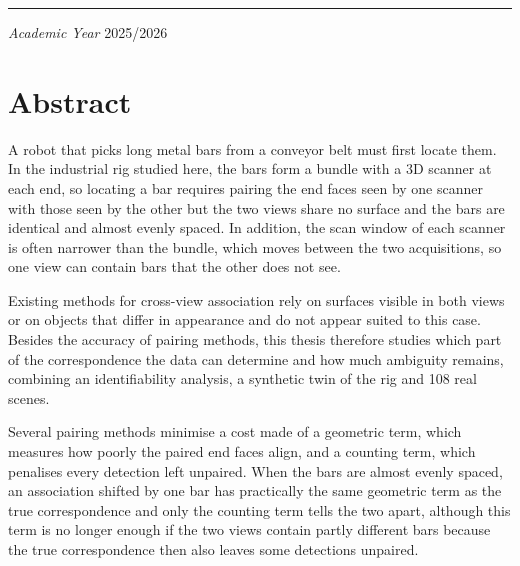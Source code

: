 \documentclass[a4paper, 12pt, twoside]{book}
\begin{document}
\begin{titlepage}
\vspace{1.5cm}

\hrule

\vspace{0.25cm}

\begin{center}
\large
\textit{Academic Year }2025/2026
\end{center}

\end{titlepage}

\restoregeometry
\normalsize

\clearpage
\null
\thispagestyle{empty}
\clearpage


\frontmatter
\chapter{Abstract}

A robot that picks long metal bars from a conveyor belt must first locate them. In the industrial rig studied here, the bars form a bundle with a 3D scanner at each end, so locating a bar requires pairing the end faces seen by one scanner with those seen by the other but the two views share no surface and the bars are identical and almost evenly spaced. In addition, the scan window of each scanner is often narrower than the bundle, which moves between the two acquisitions, so one view can contain bars that the other does not see.

Existing methods for cross-view association rely on surfaces visible in both views or on objects that differ in appearance and do not appear suited to this case. Besides the accuracy of pairing methods, this thesis therefore studies which part of the correspondence the data can determine and how much ambiguity remains, combining an identifiability analysis, a synthetic twin of the rig and 108 real scenes.

Several pairing methods minimise a cost made of a geometric term, which measures how poorly the paired end faces align, and a counting term, which penalises every detection left unpaired. When the bars are almost evenly spaced, an association shifted by one bar has practically the same geometric term as the true correspondence and only the counting term tells the two apart, although this term is no longer enough if the two views contain partly different bars because the true correspondence then also leaves some detections unpaired.
\end{document}
